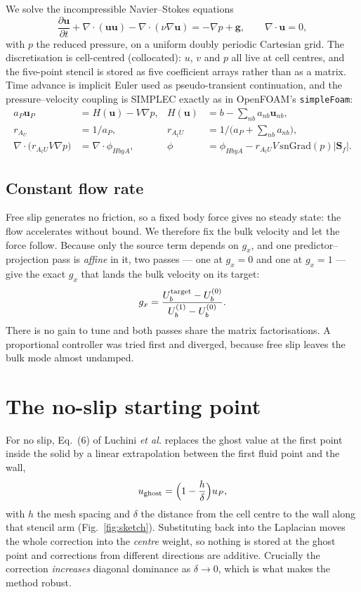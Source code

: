 \documentclass[11pt,a4paper]{article}
\newcommand{\uu}{\bm{u}}
\newcommand{\Sf}{\bm{S}_f}
\newcommand{\rAU}{r_{A_U}}
\newcommand{\rAtU}{r_{A_tU}}
\begin{document}
We solve the incompressible Navier--Stokes equations
\begin{equation}
\frac{\partial \uu}{\partial t}+\nabla\!\cdot\!(\uu\uu)-\nabla\!\cdot\!(\nu\nabla\uu)
=-\nabla p+\bm{g},\qquad \nabla\!\cdot\!\uu=0,
\end{equation}
with $p$ the reduced pressure, on a uniform doubly periodic Cartesian grid. The
discretisation is cell-centred (collocated): $u$, $v$ and $p$ all live at cell centres, and
the five-point stencil is stored as five coefficient arrays rather than as a matrix. Time
advance is implicit Euler used as pseudo-transient continuation, and the pressure--velocity
coupling is SIMPLEC exactly as in OpenFOAM's \texttt{simpleFoam}:
\begin{align}
a_P\uu_P &= H(\uu)-V\nabla p, & H(\uu)&=b-\textstyle\sum_{nb}a_{nb}\uu_{nb},\\
\rAU&=1/a_P, & \rAtU&=1/\Big(a_P+\textstyle\sum_{nb}a_{nb}\Big),\\
\nabla\!\cdot\!\big(\rAtU V\nabla p\big)&=\nabla\!\cdot\!\phi_{HbyA}, &
\phi&=\phi_{HbyA}-\rAtU V\,\mathrm{snGrad}(p)|\Sf|.
\end{align}

\subsection{Constant flow rate}
Free slip generates no friction, so a fixed body force gives no steady state: the flow
accelerates without bound. We therefore fix the bulk velocity and let the force follow.
Because only the source term depends on $g_x$, and one predictor--projection pass is
\emph{affine} in it, two passes --- one at $g_x=0$ and one at $g_x=1$ --- give the exact
$g_x$ that lands the bulk velocity on its target:
\begin{equation}
g_x=\frac{U_b^{\rm target}-U_b^{(0)}}{U_b^{(1)}-U_b^{(0)}} .
\end{equation}
There is no gain to tune and both passes share the matrix factorisations. A proportional
controller was tried first and diverged, because free slip leaves the bulk mode almost
undamped.

\section{The no-slip starting point}

For no slip, Eq.~(6) of Luchini \emph{et al.} replaces the ghost value at the first point
inside the solid by a linear extrapolation between the first fluid point and the wall,
\begin{equation}
u_{\rm ghost}=\Big(1-\frac{h}{\delta}\Big)u_P ,
\label{eq:eq6}
\end{equation}
with $h$ the mesh spacing and $\delta$ the distance from the cell centre to the wall along
that stencil arm (Fig.~\ref{fig:sketch}). Substituting back into the Laplacian moves the
whole correction into the \emph{centre} weight, so nothing is stored at the ghost point and
corrections from different directions are additive. Crucially the correction \emph{increases}
diagonal dominance as $\delta\to0$, which is what makes the method robust.
\end{document}

